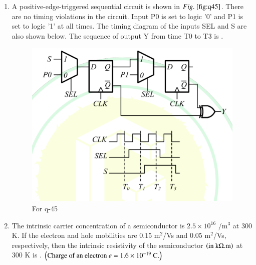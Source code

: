 \documentclass[journal,12pt,onecolumn]{IEEEtran}
\theoremstyle{remark}
\begin{document}
\begin{enumerate}
\hfill{}

\begin{enumerate}
\end{enumerate}

\item A positive-edge-triggered sequential circuit is shown in $\figref{fig:q45}$. There are no timing violations in the circuit. Input P0 is set to logic '0' and P1 is set to logic '1' at all times. The timing diagram of the inputs SEL and S are also shown below. The sequence of output Y from time T0 to T3 is \underline{\hspace{2cm}}.
\begin{figure}[H]
\centering
\includegraphics[width=0.5\columnwidth]{q45}
\caption{For q-45}
\label{fig:q45}
\end{figure}

\hfill{}

\begin{enumerate}
\end{enumerate}

\item The intrinsic carrier concentration of a semiconductor is $2.5 \times 10^{16}$ /m$^3$ at $300$ K. If the electron and hole mobilities are $0.15$ m$^2$/Vs and $0.05$ m$^2$/Vs, respectively, then the intrinsic resistivity of the semiconductor $\left(\text{in k}\ohm\text{.m}\right)$ at $300$ K is \underline{\hspace{2cm}}. $\left(\text{Charge of an electron } e = 1.6 \times 10^{-19} \text{ C.}\right)$


\end{enumerate}
\end{document}
